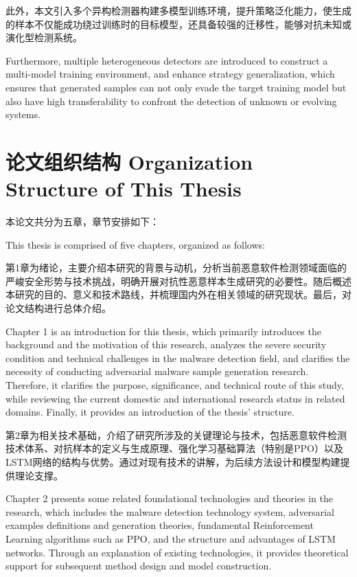 此外，本文引入多个异构检测器构建多模型训练环境，提升策略泛化能力，使生成的样本不仅能成功绕过训练时的目标模型，还具备较强的迁移性，能够对抗未知或演化型检测系统。

Furthermore, multiple heterogeneous detectors are introduced to construct a multi-model training environment, and enhance strategy generalization, which ensures that generated samples can not only evade the target training model but also have high transferability to confront the detection of unknown or evolving systems.


\section{论文组织结构 Organization Structure of This Thesis}
本论文共分为五章，章节安排如下：

This thesis is comprised of five chapters, organized as follows:

第1章为绪论，主要介绍本研究的背景与动机，分析当前恶意软件检测领域面临的严峻安全形势与技术挑战，明确开展对抗性恶意样本生成研究的必要性。随后概述本研究的目的、意义和技术路线，并梳理国内外在相关领域的研究现状。最后，对论文结构进行总体介绍。

Chapter 1 is an introduction for this thesis, which primarily introduces the background and the motivation of this research, analyzes the severe security condition and technical challenges in the malware detection field, and clarifies the necessity of conducting adversarial malware sample generation research. Therefore, it clarifies the purpose, significance, and technical route of this study, while reviewing the current domestic and international research status in related domains. Finally, it provides an introduction of the thesis’ structure.

第2章为相关技术基础，介绍了研究所涉及的关键理论与技术，包括恶意软件检测技术体系、对抗样本的定义与生成原理、强化学习基础算法（特别是PPO）以及LSTM网络的结构与优势。通过对现有技术的讲解，为后续方法设计和模型构建提供理论支撑。

Chapter 2 presents some related foundational technologies and theories in the research, which includes the malware detection technology system, adversarial examples definitions and generation theories, fundamental Reinforcement Learning algorithms such as PPO, and the structure and advantages of LSTM networks. Through an explanation of existing technologies, it provides theoretical support for subsequent method design and model construction.

